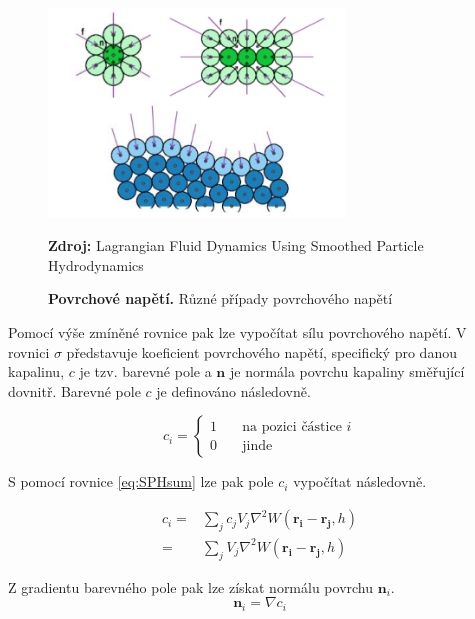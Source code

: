 \begin{figure}[hbt]
	\centering
	\captionsetup{justification=centering}
	\includegraphics[width=0.7\textwidth]{obrazky-figures/SurfTens.png}
	\caption{\textbf{Povrchové napětí.} Různé případy povrchového napětí}
	\textbf{Zdroj: } Lagrangian Fluid Dynamics Using Smoothed Particle Hydrodynamics \cite{KelagerSPH}
	\label{fig:SurTen}
\end{figure}

Pomocí výše zmíněné rovnice pak lze vypočítat sílu povrchového napětí. V rovnici $\sigma$ představuje koeficient povrchového napětí, specifický pro danou kapalinu, $c$ je tzv. barevné pole a $\mathbf{n}$ je normála povrchu kapaliny směřující dovnitř. Barevné pole $c$ je definováno následovně.

\begin{equation}
    c_i = 
    \begin{cases}
     1 & \quad  \text{na pozici částice } i \\
     0 & \quad  \text{jinde}
    \end{cases}
\end{equation}

S pomocí rovnice \ref{eq:SPHsum} lze pak pole $c_i$ vypočítat následovně.

\begin{equation}
    \begin{split}
        c_i =   & \sum_j c_j V_j \nabla^2 W(\mathbf{r_i} - \mathbf{r_j},h) \\
            =   & \sum_j V_j \nabla^2 W(\mathbf{r_i} - \mathbf{r_j},h)
    \end{split}
    \label{eq:ColorField}
\end{equation}

Z gradientu barevného pole pak lze získat normálu povrchu $\mathbf{n}_i$.
\begin{equation}
    \mathbf{n}_i = \nabla c_i
    \label{eq:SurfNormal}
\end{equation}


